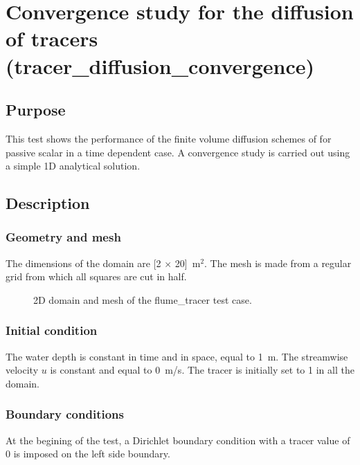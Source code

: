 \chapter{Convergence study for the diffusion of tracers (tracer\_diffusion\_convergence)}


\section{Purpose}
This test shows the performance of the finite volume diffusion schemes of
 for passive scalar in a time dependent case.
A convergence study is carried out using a simple 1D analytical solution.

\section{Description}

\subsection{Geometry and mesh}

The dimensions of the domain are [2 $\times$ 20]~m$^2$.
The mesh is made from a regular grid from which all squares are cut in half.

\begin{figure}[h!]
\centering
{}
\caption{2D domain and mesh of the flume\_tracer test case.}
\label{t2d:tracerdiffusion:mesh}
\end{figure}

\subsection{Initial condition}

The water depth is constant in time and in space, equal to 1~m.
The streamwise velocity $u$ is constant and equal to 0~m/s.
The tracer is initially set to 1 in all the domain.

\subsection{Boundary conditions}

At the begining of the test, a Dirichlet boundary condition with a tracer value
of 0 is imposed on the left side
boundary.

